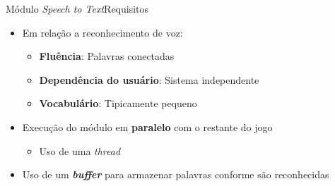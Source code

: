 \begin{frame}{Módulo \textit{Speech to Text}}{Requisitos}

\begin{itemize}
\item Em relação a reconhecimento de voz:
\begin{itemize}
  \item \textbf{Fluência}: Palavras conectadas
  \item<2-> \textbf{Dependência do usuário}: Sistema independente
  \item<3-> \textbf{Vocabulário}: Tipicamente pequeno
\end{itemize}

\item<4-> Execução do módulo em \textbf{paralelo} com o restante do jogo
\begin{itemize}
  \item Uso de uma \textit{thread}
\end{itemize}

\item<5-> Uso de um \textbf{\textit{buffer}} para armazenar palavras conforme são reconhecidas
\end{itemize}
\end{frame}



